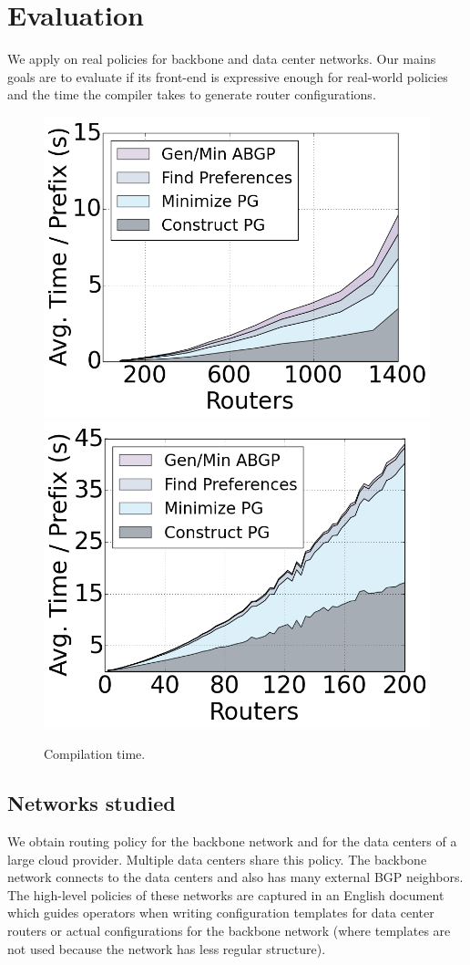\section{Evaluation}
\label{sec:evaluation}

We apply \sysname on real policies for backbone and data center networks. Our mains goals are to evaluate if its front-end is expressive enough for real-world policies and the time the compiler takes to generate router configurations.

\begin{figure}
    {\includegraphics[width=.49\columnwidth]{figures/compilation-times-dc.png}}
    {\includegraphics[width=.49\columnwidth]{figures/compilation-times-backbone.png}} \\
  \caption{Compilation time. \label{fig:compilation-times}}
  \vspace{-1em}
\end{figure}


\subsection{Networks studied}

We obtain routing policy for the backbone network and for the data centers of a large cloud provider. Multiple data centers share this policy. The backbone network connects to the data centers and also has many external BGP neighbors. The high-level policies of these networks are captured in an English document which guides operators when writing configuration templates for data center routers or actual configurations for the backbone network (where templates are not used because the network has less regular structure).

